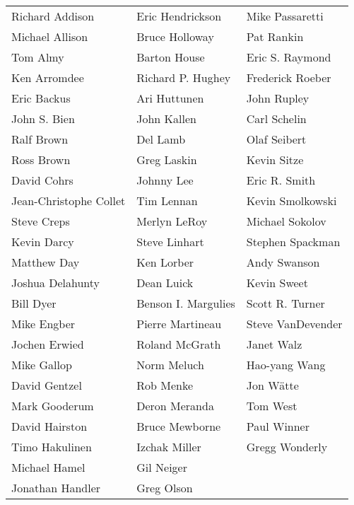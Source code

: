 \begin{center}
\begin{tabular}{lll}
Richard Addison        & Eric Hendrickson    & Mike Passaretti   \\
Michael Allison        & Bruce Holloway      & Pat Rankin        \\
Tom Almy               & Barton House        & Eric S. Raymond   \\
Ken Arromdee           & Richard P. Hughey   & Frederick Roeber  \\
Eric Backus            & Ari Huttunen        & John Rupley       \\
John S. Bien           & John Kallen         & Carl Schelin      \\
Ralf Brown             & Del Lamb            & Olaf Seibert      \\
Ross Brown             & Greg Laskin         & Kevin Sitze       \\
David Cohrs            & Johnny Lee          & Eric R. Smith     \\
Jean-Christophe Collet & Tim Lennan          & Kevin Smolkowski  \\
Steve Creps            & Merlyn LeRoy        & Michael Sokolov   \\
Kevin Darcy            & Steve Linhart       & Stephen Spackman  \\
Matthew Day            & Ken Lorber          & Andy Swanson      \\
Joshua Delahunty       & Dean Luick          & Kevin Sweet       \\
Bill Dyer              & Benson I. Margulies & Scott R. Turner   \\
Mike Engber            & Pierre Martineau    & Steve VanDevender \\
Jochen Erwied          & Roland McGrath      & Janet Walz        \\
Mike Gallop            & Norm Meluch         & Hao-yang Wang     \\
David Gentzel          & Rob Menke           & Jon W\"atte       \\
Mark Gooderum          & Deron Meranda       & Tom West          \\
David Hairston         & Bruce Mewborne      & Paul Winner       \\
Timo Hakulinen         & Izchak Miller       & Gregg Wonderly    \\
Michael Hamel          & Gil Neiger          &                   \\
Jonathan Handler       & Greg Olson          &
\end{tabular}
\end{center}

